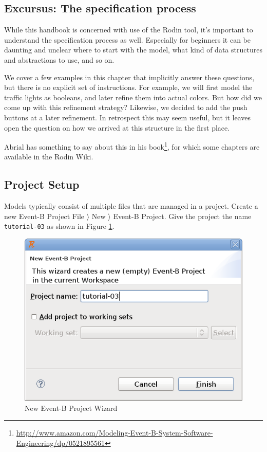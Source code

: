 \subsection{Excursus: The specification process}
\label{tut_excursus_the_sepcification_process}

While this handbook is concerned with use of the Rodin tool, it's important to understand the specification process as well.  Especially for beginners it can be daunting and unclear where to start with the model, what kind of data structures and abstractions to use, and so on.

We cover a few examples in this chapter that implicitly answer these questions, but there is no explicit set of instructions.  For example, we will first model the traffic lights as booleans, and later refine them into actual colors.  But how did we come up with this refinement strategy?  Likewise, we decided to add the push buttons at a later refinement.  In retrospect this may seem useful, but it leaves open the question on how we arrived at this structure in the first place.

Abrial has something to say about this in his book\footnote{\url{http://www.amazon.com/Modeling-Event-B-System-Software-Engineering/dp/0521895561}}, for which some chapters are available in the Rodin Wiki.

\subsection{Project Setup}
\label{tut_project_setup}

Models typically consist of multiple files that are managed in a project.  Create a new Event-B Project \textsf{File $\rangle$ New $\rangle$ Event-B Project}.  Give the project the name \texttt{tutorial-03} as shown in Figure \ref{fig_tut_03_new_project_wizard}.

\begin{figure}[!ht]
\begin{center}
	\includegraphics[]{img/tutorial/tut_03_tutorial-3.png}
	\caption{New Event-B Project Wizard}
	\label{fig_tut_03_new_project_wizard}
\end{center}
\end{figure}

